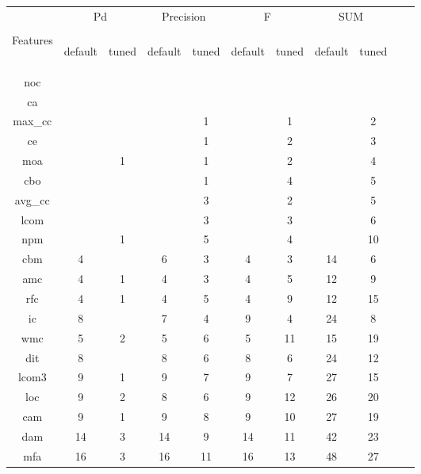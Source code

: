 \documentclass{sig-alternative}
\begin{document}
\begin{center}
\begin{figure}[!h]
\begin{tabular}{c|c c|c c|c c|c c| c c }
    & \multicolumn{2}{c|}{Pd} &  \multicolumn{2}{c|}{Precision} & \multicolumn{2}{c|}{F} &  \multicolumn{2}{c|}{SUM}\\
 &&&&&&&&\\
Features& \begin{sideways}default\end{sideways}
& \begin{sideways}tuned\end{sideways}
& \begin{sideways}default\end{sideways}
& \begin{sideways}tuned\end{sideways}
& \begin{sideways}default\end{sideways}
& \begin{sideways}tuned\end{sideways}
& \begin{sideways}default\end{sideways}
& \begin{sideways}tuned\end{sideways}
\\\hline
noc& & & & & & &  & \\
ca& & & & & & &  & \\
max\_cc& & & & 1& & 1&  & 2\\
ce& & & & 1& & 2&  & 3\\
moa& & 1& & 1& & 2&  & 4\\
cbo& & & & 1& & 4&  & 5\\
avg\_cc& & & & 3& & 2&  & 5\\
lcom& & & & 3& & 3&  & 6\\
npm& & 1& & 5& & 4&  & 10\\
cbm& 4& & 6& 3& 4& 3& 14 & 6\\
amc& 4& 1& 4& 3& 4& 5& 12 & 9\\
rfc& 4& 1& 4& 5& 4& 9& 12 & 15\\
ic& 8& & 7& 4& 9& 4& 24 & 8\\
wmc& 5& 2& 5& 6& 5& 11& 15 & 19\\
dit& 8& & 8& 6& 8& 6& 24 & 12\\
lcom3& 9& 1& 9& 7& 9& 7& 27 & 15\\
loc& 9& 2& 8& 6& 9& 12& 26 & 20\\
cam& 9& 1& 9& 8& 9& 10& 27 & 19\\
dam& 14& 3& 14& 9& 14& 11& 42 & 23\\
mfa& 16& 3& 16& 11& 16& 13& 48 & 27\\


\end{tabular}
\end{figure}
\end{center}
\end{document}
